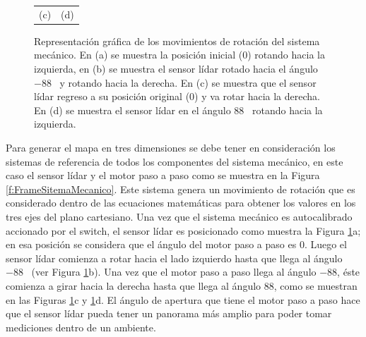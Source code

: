 \begin{figure}
\begin{tabular}{cc}
        (c)&(d)
    \end{tabular}
  \captionsetup{font=footnotesize}
    \caption{\label{f:Rot3D}Representación gráfica de los movimientos de rotación del sistema 
    mecánico. En (a) se muestra la posición inicial (0\grad) rotando hacia la izquierda, en (b) se 
    muestra el sensor lídar rotado hacia el ángulo $-88$\grad~ y rotando hacia la derecha. En (c) 
    se muestra que el sensor lídar regreso a su posición original (0\grad) y va rotar hacia la 
    derecha. En (d) se muestra el sensor lídar en el ángulo $88$\grad~ rotando hacia la izquierda.}
\end{figure}

Para generar el mapa en tres dimensiones se debe tener en consideración los sistemas de 
referencia de todos los componentes del sistema mecánico, en este caso el sensor lídar y el 
motor paso a paso como se muestra en la Figura \ref{f:FrameSitemaMecanico}. Este sistema 
genera un movimiento de rotación que es considerado dentro de las ecuaciones 
matemáticas para obtener los valores en los tres ejes del plano cartesiano. Una vez que el 
sistema mecánico es autocalibrado accionado por el switch, el sensor lídar es posicionado 
como muestra la Figura \ref{f:Rot3D}a; en esa posición se considera que el ángulo del 
motor paso a paso es 0\grad. Luego el sensor lídar  comienza a rotar hacia el lado 
izquierdo hasta que llega al ángulo $-88$\grad~ (ver Figura \ref{f:Rot3D}b). Una vez que
el motor paso a paso llega al ángulo $-88$\grad, éste comienza a girar hacia la derecha 
hasta que llega al ángulo $88$\grad, como se muestran en las Figuras \ref{f:Rot3D}c y 
\ref{f:Rot3D}d. El ángulo de apertura que tiene el motor paso a paso hace que el sensor 
lídar pueda tener un panorama más amplio para poder tomar mediciones dentro de un ambiente.

